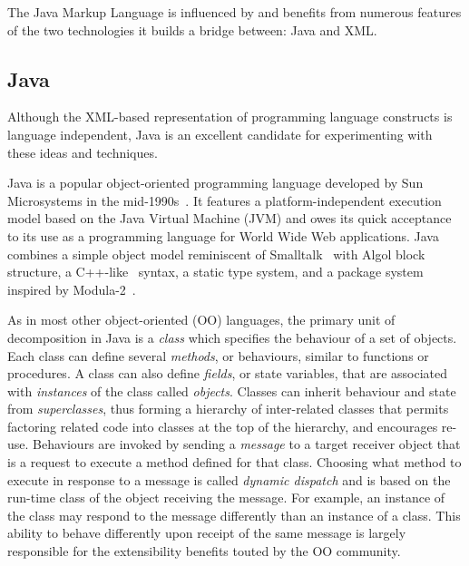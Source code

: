 \documentclass{article}
\begin{document}
\begin{multicols}{2}
The Java Markup Language is influenced by and benefits from numerous
features of the two technologies it builds a bridge between: Java and
XML.

\subsection{Java}
\label{ssec-java}

Although the XML-based representation of programming language constructs
is language independent, Java is an excellent candidate for experimenting with these
ideas and techniques.

Java is a popular object-oriented programming language developed by Sun
Microsystems in the mid-1990s~\cite{Arnold98,Flanagan97}.  It features a
platform-independent execution model based on the Java Virtual Machine
(JVM) and owes its quick acceptance to its use as a programming language
for World Wide Web applications.  Java combines a simple object model
reminiscent of Smalltalk~\cite{Goldberg89} with Algol block structure, a
C++-like~\cite{Stroustrup97} syntax, a static type system, and a package system
inspired by Modula-2~\cite{Modula2}.

As in most other object-oriented (OO) languages, the primary unit of
decomposition in Java is a \emph{class} which specifies the behaviour of
a set of objects.  Each class can define several \emph{methods}, or
behaviours, similar to functions or procedures. A class can also define
\emph{fields}, or state variables, that are associated with \emph{instances}
of the class called \emph{objects}. Classes can inherit behaviour and
state from \emph{superclasses}, thus forming a hierarchy of
inter-related classes that permits factoring related code into classes
at the top of the hierarchy, and encourages re-use.  Behaviours are
invoked by sending a \emph{message} to a target receiver object that is
a request to execute a method defined for that class.  Choosing what
method to execute in response to a message is called \emph{dynamic
  dispatch} and is based on the run-time class of the object receiving
the message.  For example, an instance of the 
class may respond to the  message differently than an
instance of a  class.  This ability to behave differently
upon receipt of the same message is largely responsible for the
extensibility benefits touted by the OO community.
    


\end{multicols}
\end{document}
